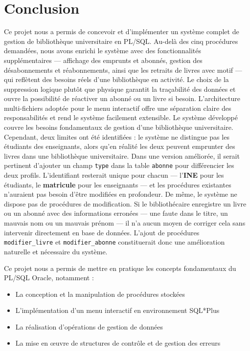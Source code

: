 \documentclass[12pt, a4paper]{report}
\begin{document}
\chapter{Conclusion}

Ce projet nous a permis de concevoir et d'implémenter un système complet
de gestion de bibliothèque universitaire en PL/SQL. Au-delà des cinq
procédures demandées, nous avons enrichi le système avec des fonctionnalités
supplémentaires --- affichage des emprunts et abonnés, gestion des
désabonnements et réabonnements, ainsi que les retraits de livres avec
motif --- qui reflètent des besoins réels d'une bibliothèque en activité.
Le choix de la suppression logique plutôt que physique garantit la
traçabilité des données et ouvre la possibilité de réactiver un abonné
ou un livre si besoin.
L'architecture multi-fichiers adoptée pour le menu interactif offre
une séparation claire des responsabilités et rend le système facilement
extensible.
Le système développé couvre les besoins fondamentaux de gestion d'une
bibliothèque universitaire. Cependant, deux limites ont été identifiées : le
système ne distingue pas les étudiants des enseignants, alors qu'en réalité
les deux peuvent emprunter des livres dans une bibliothèque universitaire.
Dans une version améliorée, il serait pertinent d'ajouter un champ
\texttt{type} dans la table \texttt{abonne} pour différencier les deux
profils. L'identifiant resterait unique pour chacun --- l'\textbf{INE}
pour les étudiants, le \textbf{matricule} pour les enseignants --- et
les procédures existantes n'auraient pas besoin d'être modifiées en
profondeur.
De même, le système ne dispose pas de procédures de modification. Si le
bibliothécaire enregistre un livre ou un abonné avec des informations
erronées --- une faute dans le titre, un mauvais nom ou un mauvais prénom
--- il n'a aucun moyen de corriger cela sans intervenir directement en
base de données. L'ajout de procédures \texttt{modifier\_livre} et
\texttt{modifier\_abonne} constituerait donc une amélioration naturelle
et nécessaire du système.


Ce projet nous a permis de mettre en pratique les concepts fondamentaux
du PL/SQL Oracle, notamment :
\begin{itemize}
	\item La conception et la manipulation de procédures stockées
	\item L'implémentation d'un menu interactif en environnement SQL*Plus
	\item La réalisation d'opérations de gestion de données
	\item La mise en œuvre de structures de contrôle et de gestion des erreurs
\end{itemize}
\end{document}
